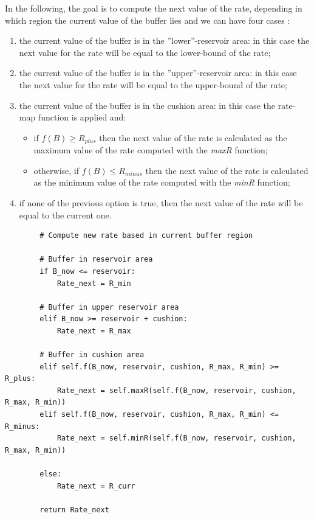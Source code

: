 \documentclass[a4paper]{report}
\begin{document}
In the following, the goal is to compute the next value of the rate, depending in which region the current value of the buffer lies and we can have four cases :
\begin{enumerate}
\item the current value of the buffer is in the ''lower''-reservoir area: in this case the next value for the rate will be equal to the lower-bound of the rate;

\item the current value of the buffer is in the ''upper''-reservoir area: in this case the next value for the rate will be equal to the upper-bound of the rate;

\item the current value of the buffer is in the cushion area: in this case the rate-map function is applied and:
\begin{itemize}
\item if $f(B) \geq R_{plus}$ then the next value of the rate is calculated as the maximum value of the rate computed with the \textit{maxR} function;
\item otherwise, if $f(B) \leq R_{minus}$ then the next value of the rate is calculated as the minimum value of the rate computed with the \textit{minR} function;
\end{itemize}

\item if none of the previous option is true, then the next value of the rate will be equal to the current one.
\end{enumerate}

\begin{Verbatim}
        # Compute new rate based in current buffer region

        # Buffer in reservoir area
        if B_now <= reservoir:
            Rate_next = R_min

        # Buffer in upper reservoir area
        elif B_now >= reservoir + cushion:
            Rate_next = R_max

        # Buffer in cushion area
        elif self.f(B_now, reservoir, cushion, R_max, R_min) >= R_plus:
            Rate_next = self.maxR(self.f(B_now, reservoir, cushion, R_max, R_min))
        elif self.f(B_now, reservoir, cushion, R_max, R_min) <= R_minus:
            Rate_next = self.minR(self.f(B_now, reservoir, cushion, R_max, R_min))
        
        else:
            Rate_next = R_curr

        return Rate_next

\end{Verbatim}
\end{document}

